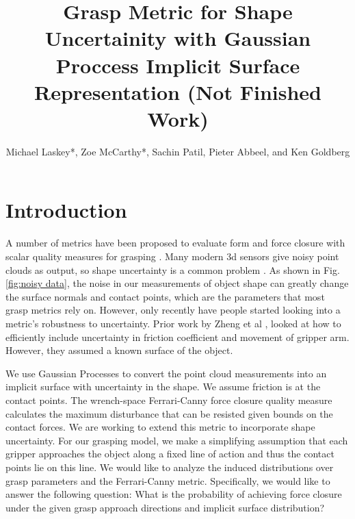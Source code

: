 \documentclass[letterpaper, 10 pt, conference]{ieeeconf}  %
\title{\LARGE \bf
Grasp Metric for Shape Uncertainity with Gaussian Proccess Implicit Surface Representation (Not Finished Work) }
\author{Michael Laskey*, Zoe McCarthy*, Sachin Patil, Pieter Abbeel, and Ken Goldberg}%
\begin{document}
\maketitle
\thispagestyle{empty}
\pagestyle{empty}





\section{Introduction}

\vspace{10pt}
 A number of metrics have been proposed to evaluate form and force closure with scalar quality measures for grasping \cite{bicchi2000}.  Many modern 3d sensors give noisy point clouds as output, so shape uncertainty is a common problem \cite{singhbigbird}. As shown in Fig. \ref{fig:noisy data}, the noise in our measurements of object shape can greatly change the surface normals and contact points, which are the parameters that most grasp metrics rely on.  However, only recently have people started looking into a metric's robustness to uncertainty. Prior work by Zheng et al \cite{zheng2005}, looked at how to efficiently include uncertainty in friction coefficient and movement of gripper arm. However, they assumed a known surface of the object.
 
We use Gaussian Processes \cite{rasmussen2006} to convert the point cloud measurements into an implicit surface with uncertainty in the shape.
We assume friction is at the contact points. 
The wrench-space Ferrari-Canny force closure quality measure \cite{ferrari1992} calculates the maximum disturbance that can be resisted given bounds on the contact forces.
We are working to extend this metric to incorporate shape uncertainty.
For our grasping model, we make a simplifying assumption that each gripper approaches the object along a fixed line of action and thus the contact points lie on this line.
We would like to analyze the induced distributions over grasp parameters and the Ferrari-Canny metric.
Specifically, we would like to answer the following question:
What is the probability of achieving force closure under the given grasp approach directions and implicit surface distribution?
\end{document}
